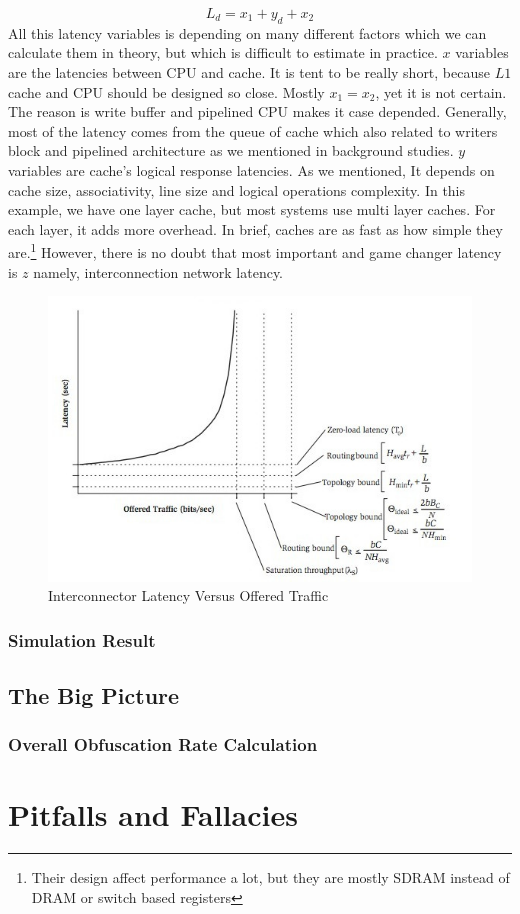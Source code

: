 \begin{equation}
L_{d}=x_{1} + y_{d} + x_{2}
\end{equation}
All this latency variables is depending on many different factors which we can calculate them in theory, but which is difficult to estimate in practice. $x$ variables are the latencies between CPU and cache. It is tent to be really short, because $L1$ cache and CPU should be designed so close. Mostly $x_{1} = x_{2}$, yet it is not certain. The reason is write buffer and pipelined CPU makes it case depended. Generally, most of the latency comes from the queue of cache which also related to writers block and pipelined architecture as we mentioned in background studies. $y$ variables are cache's logical response latencies. As we mentioned, It depends on cache size, associativity, line size and logical operations complexity. In this example, we have one layer cache, but most systems use multi layer caches. For each layer, it adds more overhead. In brief, caches are as fast as how simple they are.\footnote{Their design affect performance a lot, but they are mostly SDRAM instead of DRAM or switch based registers} However, there is no doubt that most important and game changer latency is $z$ namely, interconnection network latency.
	\begin{figure}[h!]
	    \centering
	    \includegraphics[width=1.1\textwidth]{img/latency_graph.jpg}
	    \caption{Interconnector Latency Versus Offered Traffic \cite{0122007514}}
	    \label{fig:veriticaldirection}
	\end{figure}

\subsubsection*{Simulation Result}
\subsection{The Big Picture}
\subsubsection{Overall Obfuscation Rate Calculation}
\section{Pitfalls and Fallacies}

